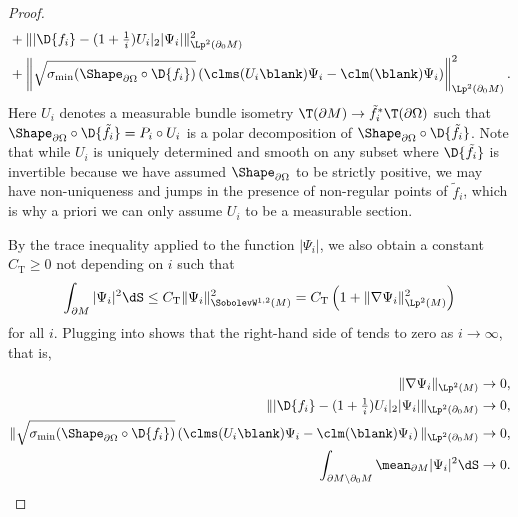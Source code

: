 \documentclass[a4paper,11pt]{amsart}
\numberwithin{equation}{section}
\begin{document}
\begin{proof}
\begin{align}
        &+ \|\lvert \D{f_i} - (1+\tfrac{1}{i}) U_i \rvert_2 |\Psi_i|\|_{\Lp^2(\partial_0 M)}^2 \nonumber \\
        &+ \left\| \sqrt{\sigma_{\min}(\Shape_{\partial\Omega} \circ \D{f_i})} \left( \clms(U_i \blank) \Psi_i - \clm(\blank)\Psi_i \right) \right\|_{\Lp^2(\partial_0 M)}^2. \nonumber
    \end{align}
    Here \(U_i\) denotes a measurable bundle isometry \(\T (\partial M) \to \tilde f_i^\ast \T (\partial \Omega)\) such that \(\Shape_{\partial\Omega} \circ \D{\tilde f_i} = P_i \circ U_i\) is a polar decomposition of \(\Shape_{\partial\Omega} \circ \D{\tilde f_i}\).
    Note that while \(U_i\) is uniquely determined and smooth on any subset where \(\D{\tilde f_i}\) is invertible because we have assumed \(\Shape_{\partial\Omega}\) to be strictly positive, we may have non-uniqueness and jumps in the presence of non-regular points of \(\tilde f_i\), which is why a priori we can only assume \(U_i\) to be a measurable section.
    
    By the trace inequality applied to the function $|\Psi_i|$, we also obtain a constant $C_{\mathrm{T}} \geq 0$ not depending on $i$ such that 
    \begin{align}
        \int_{\partial M}|\Psi_i|^2 \dS \le C_{\mathrm{T}}\|\Psi_i\|_{\SobolevW^{1,2}(M)}^2 = C_{\mathrm{T}} \left( 1 + \| \nabla \Psi_i \|^2_{\Lp^2(M)}\right) \label{eq:trace_estimate}
    \end{align}
    for all \(i\).
    Plugging  into  shows that the right-hand side of  tends to zero as \(i \to \infty\), that is,
    
    \begin{align}
        \| \nabla \Psi_i \|_{\Lp^2(M)} &\to 0, \label{eq:nabla_to_zero}\\
        \|\lvert \D{f_i} - (1+\tfrac{1}{i}) U_i \rvert_2 |\Psi_i|\|_{\Lp^2(\partial_0 M)} &\to 0, \label{eq:differential_almost_iso} \\
        \| \sqrt{\sigma_{\min}(\Shape_{\partial\Omega} \circ \D{f_i})} \left( \clms(U_i \blank) \Psi_i - \clm(\blank)\Psi_i \right)\|_{\Lp^2(\partial_0 M)} &\to 0, \label{eq:clifford_almost_equal}\\
        \int_{\partial M\setminus\partial_0 M}\mean_{\partial M}|\Psi_i|^2 \dS &\to 0. \label{eq:mean_curvature_control}
    \end{align}
    

\end{proof}
\end{document}
